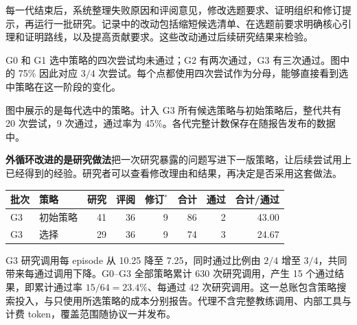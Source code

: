 
每一代结束后，系统整理失败原因和评阅意见，修改选题要求、证明组织和修订提示，再运行一批研究。记录中的改动包括缩短候选清单、在选题前要求明确核心引理和证明路线，以及提高贡献要求。这些改动通过后续研究结果来检验。

G0 和 G1 选中策略的四次尝试均未通过；G2 有两次通过，G3 有三次通过。图中的 75\% 因此对应 $3/4$ 次尝试。每个点都使用四次尝试作为分母，能够直接看到选中策略在这一阶段的变化。

图中展示的是每代选中的策略。计入 G3 所有候选策略与初始策略后，整代共有 20 次尝试，9 次通过，通过率为 45\%。各代完整计数保存在随报告发布的数据中。

\begin{insight}
\textbf{外循环改进的是研究做法}\quad 把一次研究暴露的问题写进下一版策略，让后续尝试用上已经得到的经验。研究者可以查看修改理由和结果，再决定是否采用这套做法。
\end{insight}

\begin{center}\small\setlength{\tabcolsep}{3pt}
\begin{tabularx}{\textwidth}{P{11mm}P{21mm}rrrrrr}
\toprule
\textbf{批次} & \textbf{策略} & \textbf{研究} & \textbf{评阅} & \textbf{修订$^*$} & \textbf{合计} & \textbf{通过} & \textbf{合计/通过}\\
\midrule
G3 & 初始策略 & 41 & 36 & 9 & 86 & 2 & 43.00\\
G3 & 选择 & 29 & 36 & 9 & 74 & 3 & 24.67\\
\bottomrule
\end{tabularx}
\end{center}

G3 研究调用每 episode 从 10.25 降至 7.25，同时通过比例由 $2/4$ 增至 $3/4$，共同带来每通过调用下降。G0--G3 全部策略累计 630 次研究调用，产生 15 个通过结果，即累计通过率 $15/64=23.4\%$、每通过 42 次研究调用。这一总账包含策略搜索投入，与只使用所选策略的成本分别报告。代理不含完整教练调用、内部工具与计费 token，覆盖范围随协议一并发布。


